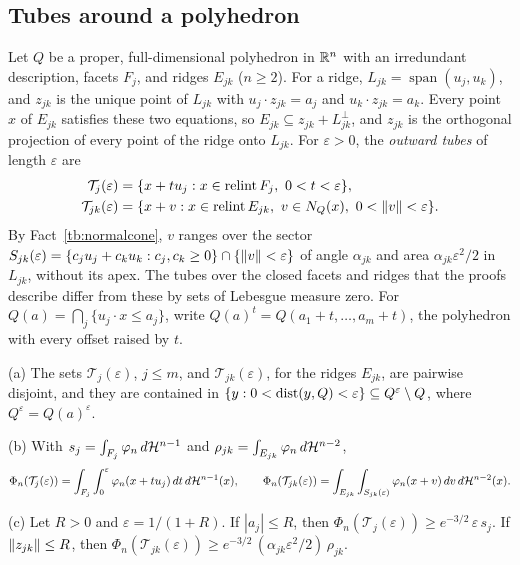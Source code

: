 \subsection{Tubes around a polyhedron}\label{tb:sec:tubes}

Let \(Q\) be a proper, full-dimensional polyhedron in \(\mathbb R^n\) with an
irredundant description, facets \(F_j\), and ridges \(E_{jk}\) (\(n\ge2\)). For
a ridge, \(L_{jk}=\operatorname{span}(u_j,u_k)\), and \(z_{jk}\) is the unique
point of \(L_{jk}\) with \(u_j\cdot z_{jk}=a_j\) and \(u_k\cdot z_{jk}=a_k\). Every
point \(x\) of \(E_{jk}\) satisfies these two equations, so
\(E_{jk}\subseteq z_{jk}+L_{jk}^\perp\), and \(z_{jk}\) is the orthogonal
projection of every point of the ridge onto \(L_{jk}\). For \(\varepsilon>0\),
the \emph{outward tubes} of length \(\varepsilon\) are
\begin{align*}
 \mathcal T_j(\varepsilon)&=\{x+tu_j:x\in\relint F_j,\ 0<t<\varepsilon\},\\
 \mathcal T_{jk}(\varepsilon)&=\{x+v:x\in\relint E_{jk},\ v\in N_Q(x),\
 0<\norm v<\varepsilon\}.
\end{align*}
By Fact~\ref{tb:normalcone}, \(v\) ranges over the sector
\(S_{jk}(\varepsilon)=\{c_ju_j+c_ku_k:c_j,c_k\ge0\}\cap
\{\left\lVert v\right\rVert<\varepsilon\}\) of angle \(\alpha_{jk}\) and area
\(\alpha_{jk}\varepsilon^2/2\) in \(L_{jk}\), without its apex. The tubes over the closed facets and ridges that
the proofs describe differ from these by sets of Lebesgue measure zero.
For \(Q(a)=\bigcap_j\{u_j\cdot x\le a_j\}\), write
\(Q(a)^t=Q(a_1+t,\ldots,a_m+t)\), the polyhedron with every offset raised by \(t\).

\begin{fact}\label{tb:tubes}
(a) The sets \(\mathcal T_j(\varepsilon)\), \(j\le m\), and
\(\mathcal T_{jk}(\varepsilon)\), for the ridges \(E_{jk}\), are pairwise
disjoint, and they are contained in
\(\{y:0<\operatorname{dist}(y,Q)<\varepsilon\}\subseteq Q^\varepsilon\setminus Q\), where
\(Q^\varepsilon=Q(a)^\varepsilon\).

(b) With \(s_j=\int_{F_j}\varphi_n\,d\mathcal H^{n-1}\) and
\(\rho_{jk}=\int_{E_{jk}}\varphi_n\,d\mathcal H^{n-2}\),
\[
 \Phi_n(\mathcal T_j(\varepsilon))=\int_{F_j}\int_0^\varepsilon
 \varphi_n(x+tu_j)\,dt\,d\mathcal H^{n-1}(x),\qquad
 \Phi_n(\mathcal T_{jk}(\varepsilon))=\int_{E_{jk}}\int_{S_{jk}(\varepsilon)}
 \varphi_n(x+v)\,dv\,d\mathcal H^{n-2}(x).
\]

(c) Let \(R>0\) and \(\varepsilon=1/(1+R)\). If \(|a_j|\le R\), then
\(\Phi_n(\mathcal T_j(\varepsilon))\ge e^{-3/2}\,\varepsilon\,s_j\). If
\(\left\lVert z_{jk}\right\rVert\le R\), then
\(\Phi_n(\mathcal T_{jk}(\varepsilon))\ge e^{-3/2}\,(\alpha_{jk}\varepsilon^2/2)\,
\rho_{jk}\).
\end{fact}

